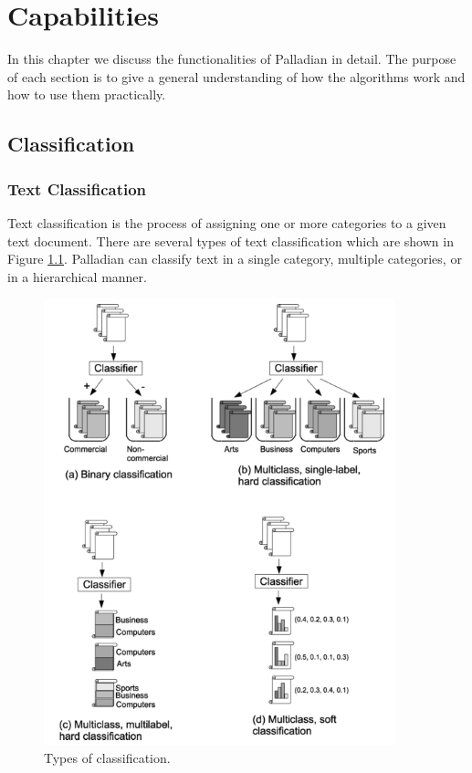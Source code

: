 \chapter{Capabilities}
In this chapter we discuss the functionalities of Palladian in detail. The purpose of each section is to give a general understanding of how the algorithms work and how to use them practically.

\section{Classification}

\subsection{Text Classification}
Text classification is the process of assigning one or more categories to a given text document. There are several types of text classification which are shown in Figure \ref{fig:typesOfClassification}. Palladian can classify text in a single category, multiple categories, or in a hierarchical manner.

\begin{figure}[ht!]
\centering
\includegraphics[width=4in]{img/typesOfClassification.png}
\caption{Types of classification\cite{qi2009web}.}
\label{fig:typesOfClassification}
\end{figure}

